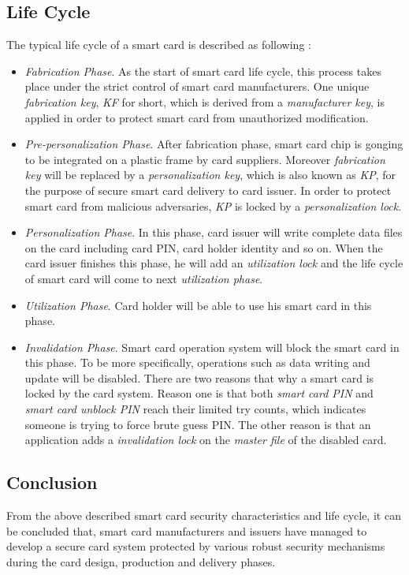 \subsection{Life Cycle} \label{secLC}
The typical life cycle of a smart card is described as following \cite{smart_card_contactless}:
\begin{itemize}
\item \emph{Fabrication Phase}. As the start of smart card life cycle, this process takes place under the strict control of smart card manufacturers. One unique \emph{fabrication key}, \emph{KF} for short, which is derived from a \emph{manufacturer key},  is applied in order to protect smart card from unauthorized modification. 
\item \emph{Pre-personalization Phase}. After fabrication phase,  smart card chip is gonging to be integrated on a plastic frame by card suppliers. Moreover \emph{fabrication key} will be replaced by a \emph{personalization key}, which is also known as \emph{KP},  for the purpose of secure smart card delivery to card issuer. In order to protect smart card from malicious adversaries, \emph{KP} is locked by a \emph{personalization lock}.
\item \emph{Personalization Phase}. In this phase,  card issuer will write complete data files on the card including card PIN, card holder identity and so on. When the card issuer finishes this phase, he will add an \emph{utilization lock} and the life cycle of smart card will come to next \emph{utilization phase}.
\item \emph{Utilization Phase}. Card holder will be able to use his smart card in this phase. 
\item \emph{Invalidation Phase}. Smart card operation system will block the smart card in this phase. To be more specifically, operations such as data writing and update will be disabled. There are two reasons that why a smart card is locked by the card system. Reason one is that both \emph{smart card PIN} and \emph{smart card unblock PIN} reach their limited  try counts, which indicates someone is trying to force brute guess PIN.  The other reason is that an application adds a \emph{invalidation lock} on the \emph{master file} of the disabled card.
\end{itemize}

\subsection {Conclusion}
From the above described smart card security characteristics and life cycle, it can be concluded that, smart card manufacturers and issuers have managed to develop a secure card system protected by various robust security mechanisms during the card design, production and delivery phases.

